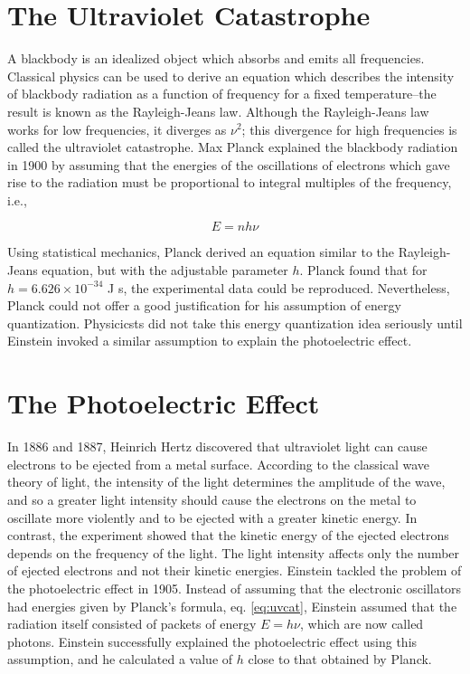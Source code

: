 \documentclass[
  9pt,
]{extbook}
\begin{document}
\hypertarget{the-ultraviolet-catastrophe}{%
\section{The Ultraviolet Catastrophe}\label{the-ultraviolet-catastrophe}}

A blackbody is an idealized object which absorbs and emits all frequencies. Classical physics can be used to derive an equation which describes the intensity of blackbody radiation as a function of frequency for a fixed temperature--the result is known as the Rayleigh-Jeans law. Although the Rayleigh-Jeans law works for low frequencies, it diverges as \(\nu^2\); this divergence for high frequencies is called the ultraviolet catastrophe.
Max Planck explained the blackbody radiation in 1900 by assuming that the energies of the oscillations of electrons which gave rise to the radiation must be proportional to integral multiples of the frequency, i.e.,

\begin{equation}
E = n h \nu
\label{eq:uvcat}
\end{equation}

Using statistical mechanics, Planck derived an equation similar to the Rayleigh-Jeans equation, but with the adjustable parameter \(h\). Planck found that for \(h = 6.626 \times 10^{-34}\) J s, the experimental data could be reproduced. Nevertheless, Planck could not offer a good justification for his assumption of energy quantization. Physicicsts did not take this energy quantization idea seriously until Einstein invoked a similar assumption to explain the photoelectric effect.

\hypertarget{the-photoelectric-effect}{%
\section{The Photoelectric Effect}\label{the-photoelectric-effect}}

In 1886 and 1887, Heinrich Hertz discovered that ultraviolet light can cause electrons to be ejected from a metal surface. According to the classical wave theory of light, the intensity of the light determines the amplitude of the wave, and so a greater light intensity should cause the electrons on the metal to oscillate more violently and to be ejected with a greater kinetic energy. In contrast, the experiment showed that the kinetic energy of the ejected electrons depends on the frequency of the light. The light intensity affects only the number of ejected electrons and not their kinetic energies.
Einstein tackled the problem of the photoelectric effect in 1905. Instead of assuming that the electronic oscillators had energies given by Planck's formula, eq. \eqref{eq:uvcat}, Einstein assumed that the radiation itself consisted of packets of energy \(E = h \nu\), which are now called photons. Einstein successfully explained the photoelectric effect using this assumption, and he calculated a value of \(h\) close to that obtained by Planck.
\end{document}
